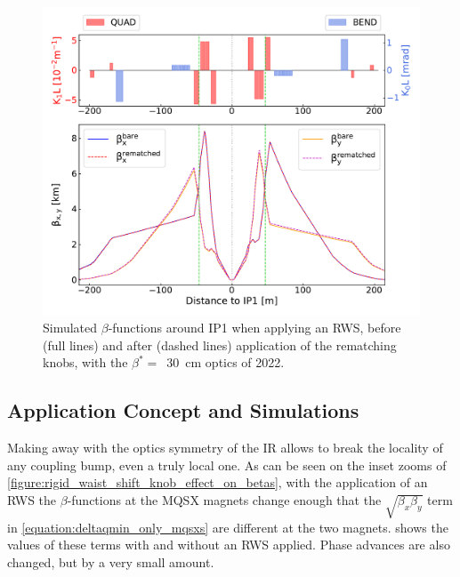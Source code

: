 \begin{figure}[!htb]
    \centering
    \includegraphics[width=\textwidth]{Figures/IR_Coupling_Correction/rws_ir1_rematching.pdf}
    \caption{Simulated \(\beta\)-functions around IP\num{1} when applying an RWS, before (full lines) and after (dashed lines) application of the rematching knobs, with the \(\beta^{\ast} =\)~\qty{30}{\centi\metre} optics of \num{2022}.}
    \label{figure:rws_ir1_rematching_betas}
\end{figure}

\subsection{Application Concept and Simulations}
\label{subsection:rws_application_and_simulations}

Making away with the optics symmetry of the \gls{IR} allows to break the locality of any coupling bump, even a truly local one.
As can be seen on the inset zooms of \cref{figure:rigid_waist_shift_knob_effect_on_betas}, with the application of an RWS the \(\beta\)-functions at the MQSX magnets change enough that the \(\sqrt{\beta_x \beta_y}\) term in \cref{equation:deltaqmin_only_mqsxs} are different at the two magnets.
 shows the values of these terms with and without an RWS applied.
Phase advances are also changed, but by a very small amount.

